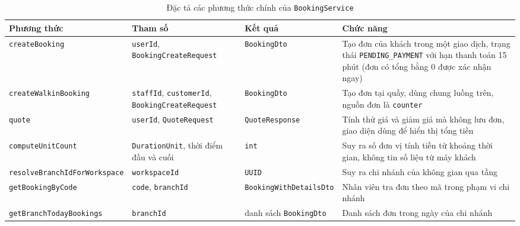 \begin{table}[H]
\centering
\caption{Đặc tả các phương thức chính của \texttt{BookingService}}
\label{tab:ht_spec_booking}
\small
\renewcommand{\arraystretch}{1.25}
\begin{tabular}{|p{4.0cm}|p{3.0cm}|p{2.9cm}|p{3.9cm}|}
\hline
\textbf{Phương thức} & \textbf{Tham số} & \textbf{Kết quả} & \textbf{Chức năng} \\
\hline
\texttt{createBooking} & \texttt{userId}, \texttt{BookingCreate\allowbreak Request} & \texttt{BookingDto} & Tạo đơn của khách trong một giao dịch, trạng thái \texttt{PENDING\_PAYMENT} với hạn thanh toán 15 phút (đơn có tổng bằng 0 được xác nhận ngay) \\
\hline
\texttt{createWalkinBooking} & \texttt{staffId}, \texttt{customerId}, \texttt{BookingCreate\allowbreak Request} & \texttt{BookingDto} & Tạo đơn tại quầy, dùng chung luồng trên, nguồn đơn là \texttt{counter} \\
\hline
\texttt{quote} & \texttt{userId}, \texttt{QuoteRequest} & \texttt{QuoteResponse} & Tính thử giá và giảm giá mà không lưu đơn, giao diện dùng để hiển thị tổng tiền \\
\hline
\texttt{computeUnitCount} & \texttt{DurationUnit}, thời điểm đầu và cuối & \texttt{int} & Suy ra số đơn vị tính tiền từ khoảng thời gian, không tin số liệu từ máy khách \\
\hline
\texttt{resolveBranchId\allowbreak ForWorkspace} & \texttt{workspaceId} & \texttt{UUID} & Suy ra chi nhánh của không gian qua tầng \\
\hline
\texttt{getBookingByCode} & \texttt{code}, \texttt{branchId} & \texttt{BookingWith\allowbreak DetailsDto} & Nhân viên tra đơn theo mã trong phạm vi chi nhánh \\
\hline
\texttt{getBranchTodayBookings} & \texttt{branchId} & danh sách \texttt{BookingDto} & Danh sách đơn trong ngày của chi nhánh \\
\hline
\end{tabular}
\end{table}


